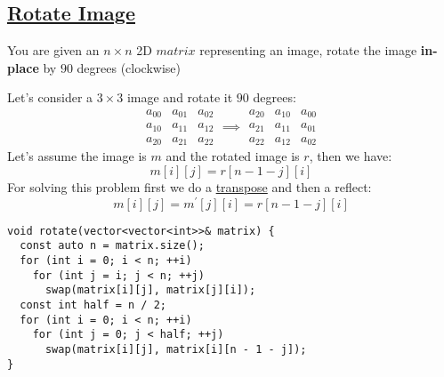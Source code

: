 \documentclass{book}
\begin{document}
	\subsection{\href{https://leetcode.com/problems/rotate-image/}{Rotate Image}}
	You are given an $n \times n$ 2D $matrix$ representing an image, rotate the image \textbf{in-place} by $90$ degrees (clockwise)
	\par Let's consider a $3 \times 3$ image and rotate it $90$ degrees:
	\begin{equation*}
		\begin{matrix}
			a_{00} & a_{01} & a_{02} \\
			a_{10} & a_{11} & a_{12} \\
			a_{20} & a_{21} & a_{22}
		\end{matrix} \implies
		\begin{matrix}
			a_{20} & a_{10} & a_{00} \\
			a_{21} & a_{11} & a_{01} \\
			a_{22} & a_{12} & a_{02}
		\end{matrix}	
	\end{equation*}
	Let's assume the image is $m$ and the rotated image is $r$, then we have:
	\begin{equation*}
		m[i][j] = r[n - 1 - j][i]
	\end{equation*}
	For solving this problem first we do a \href{https://en.wikipedia.org/wiki/Transpose}{transpose} and then a reflect:
	\begin{equation*}
		m[i][j] = m^{\prime}[j][i] = r[n - 1 - j][i]
	\end{equation*}
	\begin{lstlisting}
void rotate(vector<vector<int>>& matrix) {
  const auto n = matrix.size();
  for (int i = 0; i < n; ++i)
    for (int j = i; j < n; ++j)
      swap(matrix[i][j], matrix[j][i]);
  const int half = n / 2;
  for (int i = 0; i < n; ++i)
    for (int j = 0; j < half; ++j)
      swap(matrix[i][j], matrix[i][n - 1 - j]);
}
	\end{lstlisting}
\end{document}
